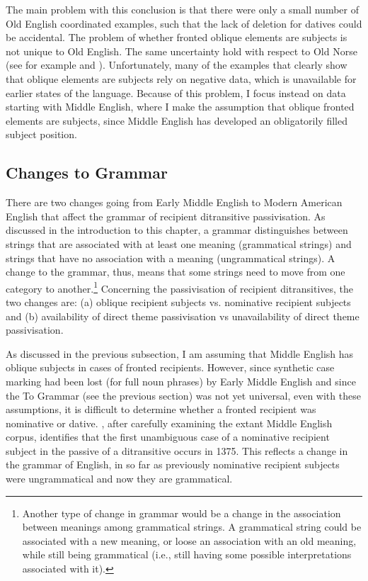 	The main problem with this conclusion is that there were only a small number of Old English coordinated examples, such that the lack of deletion for datives could be accidental. The problem of whether fronted oblique elements are subjects is not unique to Old English. The same uncertainty hold with respect to Old Norse (see for example \citealt{Kristoffersen.1991,Kristoffersen.1994} and \citealt{Bardal.2001b}). Unfortunately, many of the examples that clearly show that oblique elements are subjects rely on negative data, which is unavailable for earlier states of the language. Because of this problem, I focus instead on data starting with Middle English, where I make the assumption that oblique fronted elements are subjects, since Middle English has developed an obligatorily filled subject position.

	\subsection{Changes to Grammar}

	There are two changes going from Early Middle English to Modern American English that affect the grammar of recipient ditransitive passivisation. As discussed in the introduction to this chapter, a grammar distinguishes between strings that are associated with at least one meaning (grammatical strings) and strings that have no association with a meaning (ungrammatical strings). A change to the grammar, thus, means that some strings need to move from one category to another.\footnote{Another type of change in grammar would be a change in the association between meanings among grammatical strings. A grammatical string could be associated with a new meaning, or loose an association with an old meaning, while still being grammatical (i.e., still having some possible interpretations associated with it).} Concerning the passivisation of recipient ditransitives, the two changes are: (a) oblique recipient subjects vs. nominative recipient subjects and (b) availability of direct theme passivisation vs unavailability of direct theme passivisation. 

	As discussed in the previous subsection, I am assuming that Middle English has oblique subjects in cases of fronted recipients. However, since synthetic case marking had been lost (for full noun phrases) by Early Middle English and since the To Grammar (see the previous section) was not yet universal, even with these assumptions, it is difficult to determine whether a fronted recipient was nominative or dative. \cite{Allen.1999}, after carefully examining the extant Middle English corpus, identifies that the first unambiguous case of a nominative recipient subject in the passive of a ditransitive occurs in 1375. This reflects a change in the grammar of English, in so far as previously nominative recipient subjects were ungrammatical and now they are grammatical.

